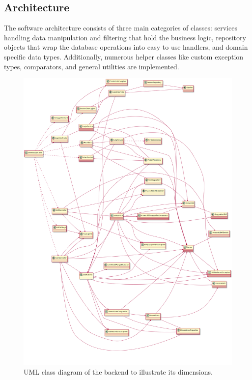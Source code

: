 \subsection{Architecture}
The software architecture consists of three main categories of classes: services handling data manipulation and filtering that hold the business logic, repository objects that wrap the database operations into easy to use handlers, and domain specific data types. Additionally, numerous helper classes like custom exception types, comparators, and general utilities are implemented.
\begin{figure}[!h]
    \centering
    \includegraphics[height=0.55\textheight]{images/uml.png}
    \caption[Diagram: Backend Classes]{UML class diagram of the backend to illustrate its dimensions.}
    \label{fig:markovchain}
\end{figure}
